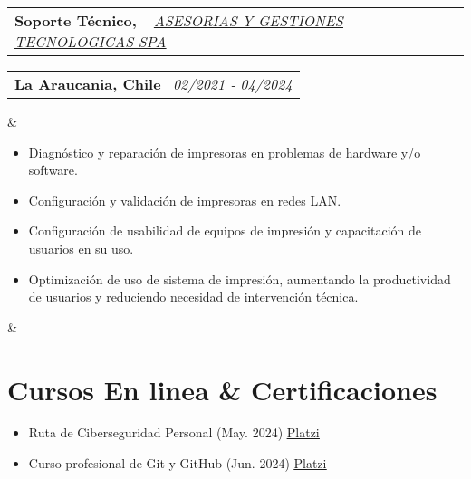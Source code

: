 \documentclass[11pt,a4paper,sans]{moderncv}
\makeatletter
\newcommand{\sectionMargin}{-3mm}
\newcommand*{\customcventry}[7][.13em]{
    \begin{tabular}{@{}l}
    {\bfseries #4} \
    {\itshape #3}
    \end{tabular}
    \hfill
    \begin{tabular}{l@{}}
    {\bfseries #5} \
    {\itshape #2}
    \end{tabular}
    \ifx&#7&%
    \else{\
    \begin{minipage}{\maincolumnwidth}%
    \small#7%
    \end{minipage}}\fi%
    \par\addvspace{#1}
}
\makeatother
\begin{document}
{    \vspace*{2mm}

    \customcventry
        {02/2021 ‐ 04/2024}
        {{ \href{http://www.tisol.cl/}{\underline{ASESORIAS Y GESTIONES TECNOLOGICAS SPA}} }}
        {Soporte Técnico,}
        {La Araucania, Chile}{}
        {{\begin{itemize}[leftmargin=0.6cm, noitemsep, label={\textbullet}]
            \item Diagnóstico y reparación de impresoras en problemas de hardware y/o software.
            \item Configuración y validación de impresoras en redes LAN.
            \item Configuración de usabilidad de equipos de impresión y capacitación de usuarios en su uso.
            \item Optimización de uso de sistema de impresión, aumentando la productividad de usuarios y reduciendo necesidad de intervención técnica.
        \end{itemize}}
    }
}

\vspace*{\sectionMargin}

\section{Cursos En linea \& Certificaciones}{
    \begin{itemize}[label=\textbullet]
        \item Ruta de Ciberseguridad Personal (May. 2024) \href{https://1drv.ms/b/c/13c8ae619d64655e/EZYaMe6SBhJAshtvq4ORCQoBwWMYRerI4_xiuqXjORVd0w?e=I4tLqg}{\underline{Platzi}}
        \item Curso profesional de Git y GitHub (Jun. 2024) \href{https://1drv.ms/b/c/13c8ae619d64655e/EXeQGPrTCjFDpmx8pCItVTwB-OS1r-tkKJbmgYnahuxtYg?e=mc9YcH}{\underline{Platzi}}
    \end{itemize}
}

\vspace*{-6mm}
\end{document}
